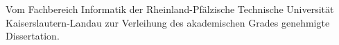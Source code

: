 \thispagestyle{empty}

\newcommand{\HRule}{\rule{\linewidth}{1mm}}
 \begin{center}
  \vbox{
  \vspace{2.5cm}
  \protect{\vbox{\bf \LARGE \RRLABVARtitle}}
  \vspace{3cm}
  \protect{\vbox{\bf \Large \RRLABVARauthor}}
  \vspace{3cm}
  \vbox{Vom Fachbereich Informatik der}
  \vspace{0.5cm}
  \vbox{\Large Rheinland-Pf\"alzische Technische Universit\"at Kaiserslautern-Landau}
  \vspace{0.5cm}
   \vbox{zur Verleihung des akademischen Grades}
  \vspace{0.5cm} 
   \vbox{\Large \RRLABVARdegree}
  \vspace{0.5cm}
  \vbox{genehmigte Dissertation.}
  \vspace{0.5cm}}
\end{center}
\clearpage
